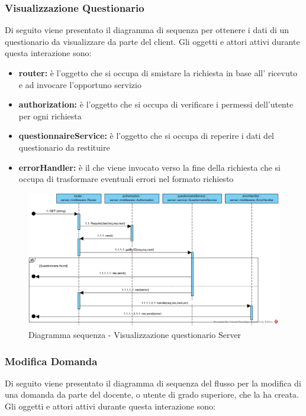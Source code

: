 \documentclass[12pt,a4paper]{article}
\begin{document}
\newpage
\subsubsection{Visualizzazione Questionario}
Di seguito viene presentato il diagramma di sequenza per ottenere i dati di un questionario da visualizzare da parte del client. Gli oggetti e attori attivi durante questa interazione sono:

\begin{itemize}
	\item \textbf{router:} è l'oggetto che si occupa di smistare la richiesta in base all’ ricevuto e ad invocare l’opportuno servizio
	\item \textbf{authorization:} è l'oggetto che si occupa di verificare i permessi dell'utente per ogni richiesta	
	\item \textbf{questionnaireService:} è l'oggetto che si occupa di reperire i dati del questionario da restituire
	\item \textbf{errorHandler:} è il  che viene invocato verso la fine della richiesta che si occupa di trasformare eventuali errori nel formato  richiesto
\end{itemize}

\begin{center}
	\begin{figure}[H]
		\centering \includegraphics[max width=\myheight, angle=90]{../img/diagrammiSequenza/getQuestionnareDaEseguireServer.png}
		\caption{Diagramma sequenza - Visualizzazione questionario Server}
	\end{figure}
\end{center}

\newpage
\subsubsection{Modifica Domanda}
Di seguito viene presentato il diagramma di sequenza del flusso per la modifica di una domanda da parte del docente, o utente di grado superiore, che la ha creata. Gli oggetti e attori attivi durante questa interazione sono:
\end{document}
